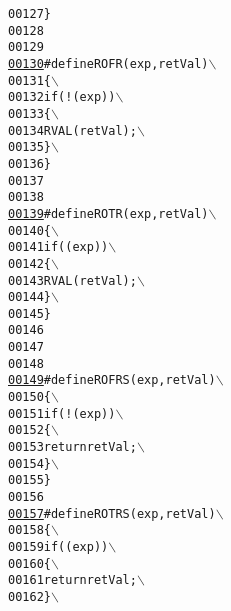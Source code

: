 \begin{footnotesize}
\begin{alltt}
00127 \textcolor{preprocessor}{        \}}
00128 \textcolor{preprocessor}{}
00129 
\hypertarget{_macros_8h_source_l00130}{}\hyperlink{_macros_8h_ae2a99726329f7bc095ce9874925192ed}{00130} \textcolor{preprocessor}{#define ROFR( exp, retVal )   \(\backslash\)}
00131 \textcolor{preprocessor}{\{                             \(\backslash\)}
00132 \textcolor{preprocessor}{        if( !( exp ) )              \(\backslash\)}
00133 \textcolor{preprocessor}{\{                           \(\backslash\)}
00134 \textcolor{preprocessor}{        RVAL( retVal );           \(\backslash\)}
00135 \textcolor{preprocessor}{        \}                           \(\backslash\)}
00136 \textcolor{preprocessor}{        \}}
00137 \textcolor{preprocessor}{}
00138 
\hypertarget{_macros_8h_source_l00139}{}\hyperlink{_macros_8h_ad8458b82bf4d3ffcb218ba13facb1869}{00139} \textcolor{preprocessor}{#define ROTR( exp, retVal )   \(\backslash\)}
00140 \textcolor{preprocessor}{\{                             \(\backslash\)}
00141 \textcolor{preprocessor}{        if( ( exp ) )               \(\backslash\)}
00142 \textcolor{preprocessor}{\{                           \(\backslash\)}
00143 \textcolor{preprocessor}{        RVAL( retVal );             \(\backslash\)}
00144 \textcolor{preprocessor}{        \}                           \(\backslash\)}
00145 \textcolor{preprocessor}{        \}}
00146 \textcolor{preprocessor}{}
00147 
00148 
\hypertarget{_macros_8h_source_l00149}{}\hyperlink{_macros_8h_a5e7532977dfe1d6cd79923fdb5dbb558}{00149} \textcolor{preprocessor}{#define ROFRS( exp, retVal )  \(\backslash\)}
00150 \textcolor{preprocessor}{\{                             \(\backslash\)}
00151 \textcolor{preprocessor}{        if( !( exp ) )              \(\backslash\)}
00152 \textcolor{preprocessor}{\{                           \(\backslash\)}
00153 \textcolor{preprocessor}{        return retVal;            \(\backslash\)}
00154 \textcolor{preprocessor}{        \}                           \(\backslash\)}
00155 \textcolor{preprocessor}{        \}}
00156 \textcolor{preprocessor}{}
\hypertarget{_macros_8h_source_l00157}{}\hyperlink{_macros_8h_aa2df507bf8fdb7ebbb8d50b312d7b78d}{00157} \textcolor{preprocessor}{#define ROTRS( exp, retVal )  \(\backslash\)}
00158 \textcolor{preprocessor}{\{                             \(\backslash\)}
00159 \textcolor{preprocessor}{        if( ( exp ) )               \(\backslash\)}
00160 \textcolor{preprocessor}{\{                           \(\backslash\)}
00161 \textcolor{preprocessor}{        return retVal;            \(\backslash\)}
00162 \textcolor{preprocessor}{        \}                           \(\backslash\)}

\end{alltt}
\end{footnotesize}
